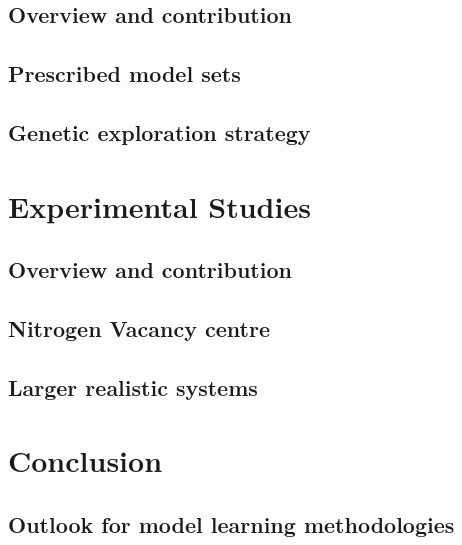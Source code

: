     \chapter*{Overview and contribution}
        
    \chapter{Prescribed model sets}\label{chapter:lattices}
        
    \chapter{Genetic exploration strategy}\label{chapter:ga}
        

\part{Experimental Studies}\label{part:experimental_study}
    \chapter*{Overview and contribution}
        
    \chapter{Nitrogen Vacancy centre}\label{chapter:nv}
        
    \chapter{Larger realistic systems}\label{chapter:many_qubits}
        
    
\part{Conclusion}\label{part:conclusion}
    \chapter{Outlook for model learning methodologies}\label{chapter:outlook}
        



